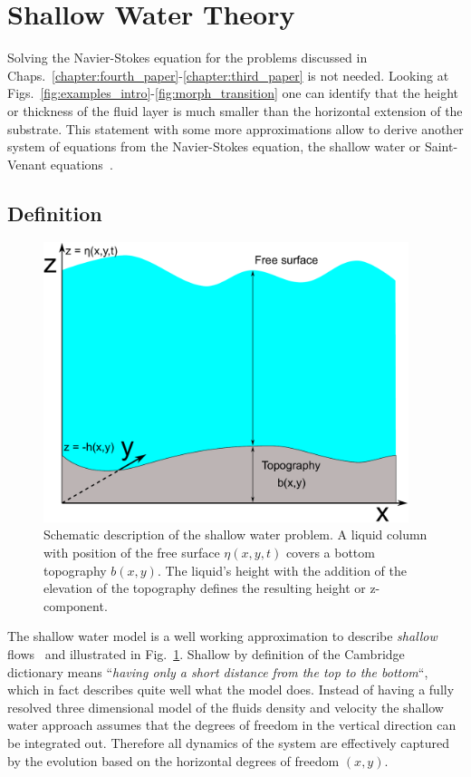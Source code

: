 \section{Shallow Water Theory}
\label{sec:theory_shallow_water}
Solving the Navier-Stokes equation for the problems discussed in Chaps.~\ref{chapter:fourth_paper}-\ref{chapter:third_paper} is not needed.
Looking at Figs.~\ref{fig:examples_intro}-\ref{fig:morph_transition} one can identify that the height or thickness of the fluid layer is much smaller than the horizontal extension of the substrate.
This statement with some more approximations allow to derive another system of equations from the Navier-Stokes equation, the shallow water or Saint-Venant equations~\cite{saint1871theorie}.

\subsection{Definition}
\begin{figure}
    \centering
    \includegraphics[width=0.95\textwidth]{graphics/simple_shallow_water.pdf}
    \caption{Schematic description of the shallow water problem. A liquid column with position of the free surface $\eta(x,y,t)$ covers a bottom topography $b(x,y)$.
    The liquid's height with the addition of the elevation of the topography defines the resulting height or z-component.}
    \label{fig:shallow_water_drawing}
\end{figure}

The shallow water model is a well working approximation to describe \textit{shallow} flows~\cite{tan1992shallow} and illustrated in Fig.~\ref{fig:shallow_water_drawing}.
Shallow by definition of the Cambridge dictionary means ``\textit{having only a short distance from the top to the bottom}``, which in fact describes quite well what the model does.
Instead of having a fully resolved three dimensional model of the fluids density and velocity the shallow water approach assumes that the degrees of freedom in the vertical direction can be integrated out. 
Therefore all dynamics of the system are effectively captured by the evolution based on the horizontal degrees of freedom $(x,y)$.

